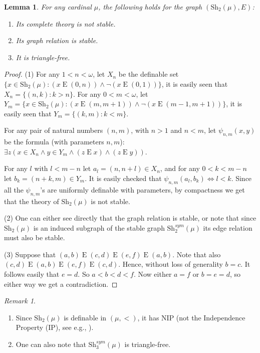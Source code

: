 \documentclass[a4paper]{amsart}
\theoremstyle{plain}
\newtheorem{lemma}[theorem]{Lemma}
\theoremstyle{definition}
\theoremstyle{remark}
\newtheorem{remark}[theorem]{Remark}
\numberwithin{equation}{section}
\newcommand{\Sh}{\text{Sh}}
\newcommand{\E}{\mathrel{E}}
\begin{document}
\begin{lemma}\label{L:properties of shift2}
For any cardinal $\mu$, the following holds for the graph $(\Sh_2(\mu),E)$:
\begin{enumerate}
\item Its complete theory is not stable.
\item Its graph relation is stable.
\item It is triangle-free.
\end{enumerate}
\end{lemma}
\begin{proof}
(1) For any $1<n<\omega$, let $X_n$ be the definable set $\{x\in \Sh_2(\mu): (x\E (0,n)) \wedge \neg(x\E (0,1))\}$, it is easily seen that $X_n=\{(n,k): k>n\}$. For any $0<m<\omega$, let $Y_m=\{x\in \Sh_2(\mu): (x\E (m,m+1))\wedge \neg(x\E (m-1,m+1))\}$, it is easily seen that $Y_m=\{(k,m): k<m\}$. 

For any pair of natural numbers $(n,m)$, with $n>1$ and $n<m$, let $\psi_{n,m}(x,y)$ be the formula (with parameters $n,m$): $\exists z (x\in X_n\wedge y\in Y_m\wedge (z\E x)\wedge (z\E y))$. 

For any $l$ with $l<m-n$ let $a_l=(n,n+l)\in X_n$, and for any $0<k<m-n$ let $b_k=(n+k,m)\in Y_m$. It is easily checked that $\psi_{n,m}(a_l,b_k) \iff l<k$. Since all the $\psi_{n,m}$'s are uniformly definable with parameters, by compactness we get that the theory of $\Sh_2(\mu)$ is not stable.

(2) One can either see directly that the graph relation is stable, or note that since $\Sh_2(\mu)$ is an induced subgraph of the stable graph $\Sh_2^{sym}(\mu)$ its edge relation must also be stable.

(3) Suppose that $(a,b)\E(c,d)\E(e,f)\E(a,b)$. Note that also $(c,d)\E(a,b)\E(e,f)\E(c,d)$. Hence, without loss of generality $b=c$. It follows easily that  $e=d$. So $a<b<d<f$. Now either $a=f$ or $b=e=d$, so either way we get a contradiction.
\end{proof}

\begin{remark}\label{R:Sh3}
\begin{enumerate} 
\item Since $\Sh_2(\mu)$ is definable in $(\mu,<)$, it has NIP (not the Independence Property (IP), see e.g., \cite{guidetonip}). 
\item One can also note that $\Sh_3^{sym}(\mu)$ is triangle-free.
\end{enumerate}
\end{remark}
\end{document}
